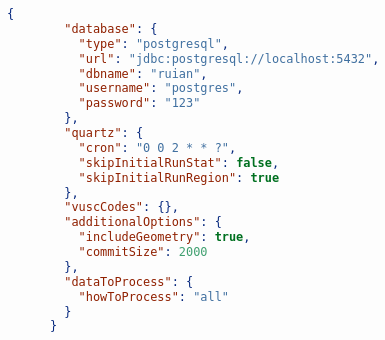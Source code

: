 \begin{lstlisting}[language=json, caption={Konfigurační soubor pro test rychlosti}, label={lst:konfigTest}]
    {
        "database": {
          "type": "postgresql",
          "url": "jdbc:postgresql://localhost:5432",
          "dbname": "ruian",
          "username": "postgres",
          "password": "123"
        },
        "quartz": {
          "cron": "0 0 2 * * ?",
          "skipInitialRunStat": false,
          "skipInitialRunRegion": true
        },
        "vuscCodes": {},
        "additionalOptions": {
          "includeGeometry": true,
          "commitSize": 2000
        },
        "dataToProcess": {
          "howToProcess": "all"
        }
      }    
\end{lstlisting}
